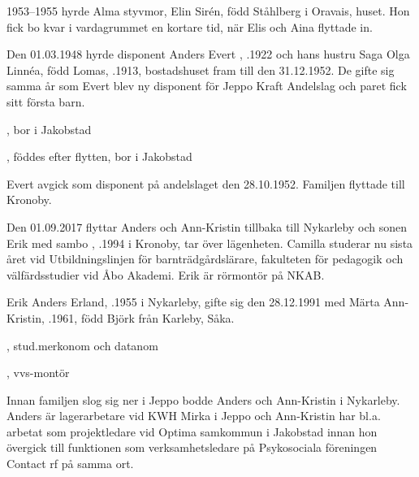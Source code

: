 1953--1955 hyrde Alma  styvmor, Elin Sirén, född Ståhlberg i Oravais, huset. Hon fick bo kvar i vardagrummet en kortare tid, när Elis och Aina flyttade in.

Den 01.03.1948 hyrde disponent Anders Evert , .1922 och hans hustru Saga Olga Linnéa, född Lomas, .1913, bostadshuset fram till den 31.12.1952. De gifte sig samma år som Evert blev ny disponent för Jeppo Kraft Andelslag och paret fick sitt första barn.
\begin{jhchildren}
  \item {}, bor i Jakobstad
  \item {}, föddes efter flytten, bor i Jakobstad
\end{jhchildren}
Evert avgick som disponent på andelslaget den 28.10.1952. Familjen flyttade till Kronoby.






Den 01.09.2017 flyttar Anders och Ann-Kristin tillbaka till Nykarleby och sonen Erik med sambo , .1994 i Kronoby, tar över lägenheten. Camilla studerar nu sista året vid Utbildningslinjen för barnträdgårdslärare, fakulteten för pedagogik och välfärdsstudier vid Åbo Akademi. Erik är rörmontör på NKAB.


Erik Anders Erland, .1955 i Nykarleby, gifte sig den 28.12.1991 med Märta Ann-Kristin, .1961, född Björk från Karleby, Såka.
\begin{jhchildren}
  \item {}, stud.merkonom och datanom
  \item {}, vvs-montör
\end{jhchildren}

Innan familjen slog sig ner i Jeppo bodde Anders och Ann-Kristin i Nykarleby. Anders är lagerarbetare vid KWH Mirka i Jeppo och Ann-Kristin har bl.a. arbetat som projektledare vid Optima samkommun i Jakobstad innan hon övergick till funktionen som verksamhetsledare på Psykosociala föreningen Contact rf på samma ort.

